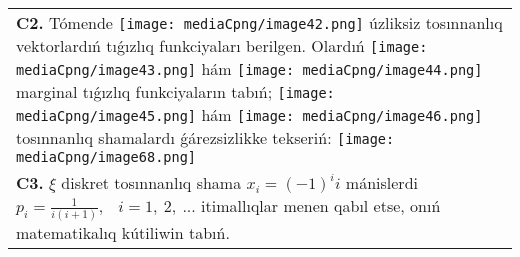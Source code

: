 \documentclass{article}
\begin{document}
\begin{tabular}{m{17cm}}
 \\
\textbf{C2.} Tómende \texttt{[image: mediaCpng/image42.png]} úzliksiz tosınnanlıq vektorlardıń tıǵızlıq funkciyaları berilgen. Olardıń \texttt{[image: mediaCpng/image43.png]} hám \texttt{[image: mediaCpng/image44.png]} marginal tıǵızlıq funkciyaların tabıń; \texttt{[image: mediaCpng/image45.png]} hám \texttt{[image: mediaCpng/image46.png]} tosınnanlıq shamalardı ǵárezsizlikke tekseriń: \texttt{[image: mediaCpng/image68.png]}
 \\
\textbf{C3.} 
\(\xi\) diskret tosınnanlıq shama \(x_{i} = ( - 1)^{i}i\) mánislerdi \(p_{i} = \frac{1}{i(i + 1)},\) \(\ \ i = 1,\ 2,\ ...\) itimallıqlar menen qabıl etse, onıń matematikalıq kútiliwin tabıń.
 \\

\end{tabular}
\vspace{1cm}
\end{document}
